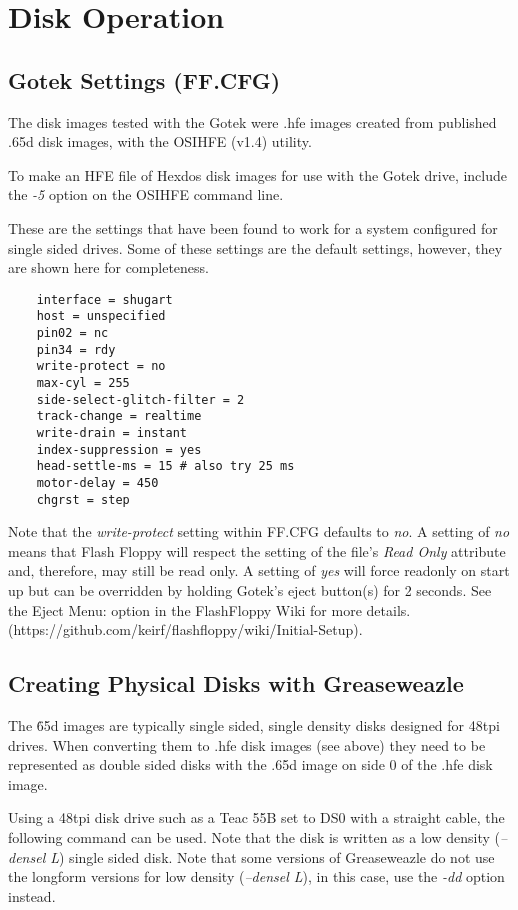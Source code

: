 \chapter{Disk Operation}

\section{Gotek Settings (FF.CFG)}

The disk images tested with the Gotek were .hfe images created from published .65d disk images, with the OSIHFE (v1.4) utility.

To make an HFE file of Hexdos disk images for use with the Gotek drive, include the \emph{-5} option on the OSIHFE command line.

These are the settings that have been found to work for a system configured for single sided drives. Some of these settings are the default settings, however, they are shown here for completeness.

\begin{verbatim}
    interface = shugart
    host = unspecified
    pin02 = nc
    pin34 = rdy
    write-protect = no
    max-cyl = 255
    side-select-glitch-filter = 2
    track-change = realtime
    write-drain = instant
    index-suppression = yes
    head-settle-ms = 15 # also try 25 ms
    motor-delay = 450
    chgrst = step
\end{verbatim}


Note that the \emph{write-protect} setting within FF.CFG defaults to \emph{no}. A setting of \emph{no} means that Flash Floppy will respect the setting of the file's \emph{Read Only} attribute and, therefore, may still be read only. A setting of \emph{yes} will force readonly on start up but can be overridden by holding Gotek's eject button(s) for 2 seconds. See the Eject Menu: option in the FlashFloppy Wiki for more details. (https://github.com/keirf/flashfloppy/wiki/Initial-Setup).


\section{Creating Physical Disks with Greaseweazle}

The \.65d images are typically single sided, single density disks designed for 48tpi drives. When converting them to .hfe disk images (see above) they need to be represented as double sided disks with the .65d image on side 0 of the .hfe disk image.

Using a 48tpi disk drive such as a Teac 55B set to DS0 with a straight cable, the following command can be used. Note that the disk is written as a low density (\emph{--densel L}) single sided disk. Note that some versions of Greaseweazle do not use the longform versions for low density (\emph{--densel L}), in this case, use the \emph{-dd} option instead.

